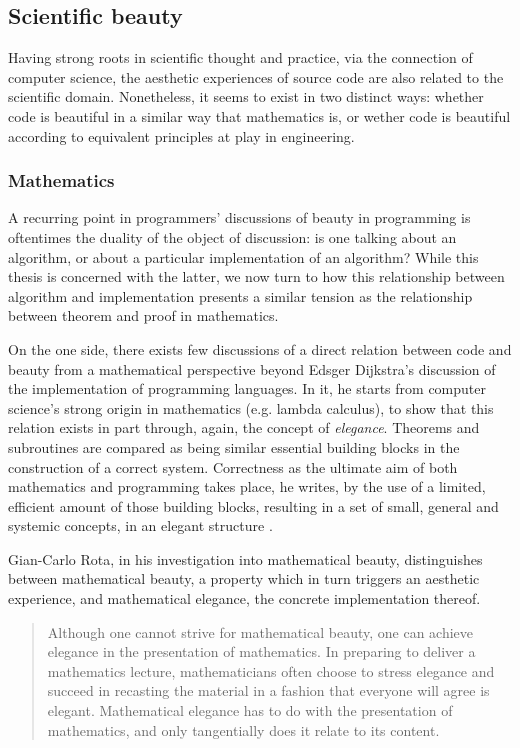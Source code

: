 \subsection{Scientific beauty}
\label{subsec:scientific-beauty}

Having strong roots in scientific thought and practice, via the connection of computer science, the aesthetic experiences of source code are also related to the scientific domain. Nonetheless, it seems to exist in two distinct ways: whether code is beautiful in a similar way that mathematics is, or wether code is beautiful according to equivalent principles at play in engineering.

\subsubsection{Mathematics}
\label{subsubsec:beauty-mathematics}

A recurring point in programmers' discussions of beauty in programming is oftentimes the duality of the object of discussion: is one talking about an algorithm, or about a particular implementation of an algorithm? While this thesis is concerned with the latter, we now turn to how this relationship between algorithm and implementation presents a similar tension as the relationship between theorem and proof in mathematics.

On the one side, there exists few discussions of a direct relation between code and beauty from a mathematical perspective beyond Edsger Dijkstra's discussion of the implementation of programming languages. In it, he starts from computer science's strong origin in mathematics (e.g. lambda calculus), to show that this relation exists in part through, again, the concept of \emph{elegance}. Theorems and subroutines are compared as being similar essential building blocks in the construction of a correct system. Correctness as the ultimate aim of both mathematics and programming takes place, he writes, by the use of a limited, efficient amount of those building blocks, resulting in a set of small, general and systemic concepts, in an elegant structure \citep{dijkstra_design_1963}.

Gian-Carlo Rota, in his investigation into mathematical beauty, distinguishes between mathematical beauty, a property which in turn triggers an aesthetic experience, and mathematical elegance, the concrete implementation thereof.

\begin{quote}
  Although one cannot strive for mathematical beauty, one can achieve elegance in the presentation of mathematics. In preparing to deliver a mathematics lecture, mathematicians often choose to stress elegance and succeed in recasting the material in a fashion that everyone will agree is elegant. Mathematical elegance has to do with the presentation of mathematics, and only tangentially does it relate to its content. \citep{rota_phenomenology_1997}
\end{quote}

